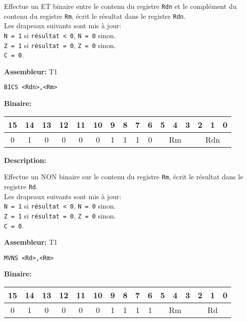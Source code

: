 \documentclass{article}
\begin{document}
    Effectue un ET binaire entre le contenu du registre \texttt{Rdn} et le complément du contenu du registre \texttt{Rm}, écrit le résultat dans le registre \texttt{Rdn}.\\
    Les drapeaux suivants sont mis à jour:\\
    \texttt{N = 1} si \texttt{résultat < 0}, \texttt{N = 0} sinon.\\
    \texttt{Z = 1} si \texttt{résultat = 0}, \texttt{Z = 0} sinon.\\
    \texttt{C = 0}.

    \textbf{Assembleur:} T1

    \begin{lstlisting}
BICS <Rdn>,<Rm>
    \end{lstlisting}

    \textbf{Binaire:}

    \begin{tabular}{| c c c c c c c c c c c c c c c c |}
        \hline
        15 & 14 & 13 & 12 & 11 & 10 & \multicolumn{1}{|c}{9} & 8 & 7 & 6 & \multicolumn{1}{|c}{5} & 4 & 3 & \multicolumn{1}{|c}{2} & 1 & 0 \\
        \hline
        0 & 1 & 0 & 0 & 0 & 0 & \multicolumn{1}{|c}{1} & 1 & 1 & 0 & \multicolumn{3}{|c}{Rm} & \multicolumn{3}{|c|}{Rdn} \\
        \hline
    \end{tabular}



    \textbf{Description: }

    Effectue un NON binaire sur le contenu du registre \texttt{Rm}, écrit le résultat dans le registre \texttt{Rd}.\\
    Les drapeaux suivants sont mis à jour:\\
    \texttt{N = 1} si \texttt{résultat < 0}, \texttt{N = 0} sinon.\\
    \texttt{Z = 1} si \texttt{résultat = 0}, \texttt{Z = 0} sinon.\\
    \texttt{C = 0}.

    \textbf{Assembleur:} T1

    \begin{lstlisting}
MVNS <Rd>,<Rm>
    \end{lstlisting}

    \textbf{Binaire:}

    \begin{tabular}{| c c c c c c c c c c c c c c c c |}
        \hline
        15 & 14 & 13 & 12 & 11 & 10 & \multicolumn{1}{|c}{9} & 8 & 7 & 6 & \multicolumn{1}{|c}{5} & 4 & 3 & \multicolumn{1}{|c}{2} & 1 & 0 \\
        \hline
        0 & 1 & 0 & 0 & 0 & 0 & \multicolumn{1}{|c}{1} & 1 & 1 & 1 & \multicolumn{3}{|c}{Rm} & \multicolumn{3}{|c|}{Rd} \\
        \hline
    \end{tabular}
\end{document}
